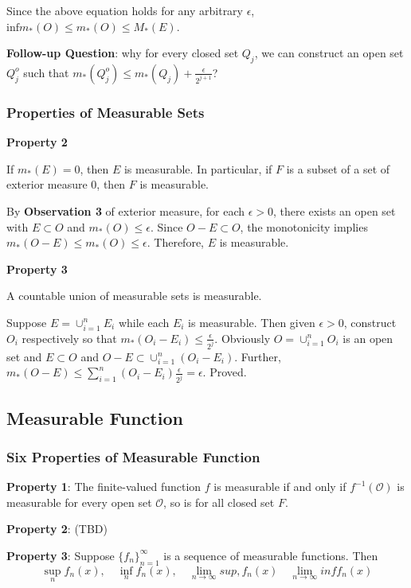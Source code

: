 \documentclass[
]{article}
\begin{document}
Since the above equation holds for any arbitrary \(\epsilon\),
\(\mathrm{inf}m_*(O)\leq m_*(O)\leq M_*(E)\).

\textbf{Follow-up Question}: why for every closed set \(Q_j\), we can
construct an open set \(Q_{j}^{o}\) such that
\(m_*(Q_j^o)\leq m_*(Q_j)+\frac{\epsilon}{2^{j+1}} \)?

\hypertarget{header-n25}{%
\subsubsection{Properties of Measurable Sets}\label{header-n25}}

\textbf{Property 2}

If \(m_*(E)=0\), then \(E\) is measurable. In particular, if \(F\) is a
subset of a set of exterior measure 0, then \(F\) is measurable.

By \textbf{Observation 3} of exterior measure, for each
\(\epsilon > 0\), there exists an open set with \(E \subset O\) and
\(m_*(O)\leq \epsilon\). Since \(O-E \subset O\), the monotonicity
implies \(m_*(O-E)\leq m_*(O)\leq \epsilon\). Therefore, \(E\) is
measurable.

\textbf{Property 3}

A countable union of measurable sets is measurable.

Suppose \(E=\cup_{i=1}^nE_i\) while each \(E_i\) is measurable. Then
given \(\epsilon>0\), construct \(O_i\) respectively so that
\(m_*(O_i-E_i)\leq \frac{\epsilon}{2^j}\). Obviously
\(O=\cup_{i=1}^nO_i\) is an open set and \(E\subset O\) and
\(O-E\subset \cup_{i=1}^n(O_i-E_i)\). Further,
\(m_*(O-E)\leq \sum_{i=1}^n(O_i-E_i)\frac{\epsilon}{2^j}=\epsilon\).
Proved.

\subsection{Measurable Function}
\subsubsection{Six Properties of Measurable Function}

\textbf{Property 1}: The finite-valued function \(f\) is measurable if and only if
\(f^{-1}(\mathcal{O})\) is measurable for every open set \(\mathcal{O}\), so is for
all closed set \(F\).

\textbf{Property 2}: (TBD)

\textbf{Property 3}: Suppose \(\{f_n\}_{n=1}^{\infty}\) is a sequence of measurable functions.
Then
\[\sup_n f_n(x), \quad \inf_n f_n(x), \quad\lim_{n\to\infty} sup, f_n(x) \quad\lim_{n\to\infty} inf f_n(x)\]
\end{document}
